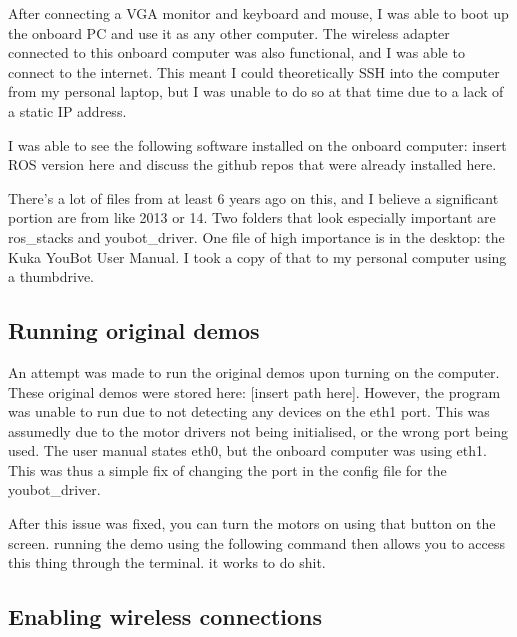 \documentclass[a4paper, 12pt]{article}
\newif\ifshownotes
\newcommand{\notes}[1]{\ifshownotes\textcolor{blue}{#1}\fi}
\begin{document}
    After connecting a VGA monitor and keyboard and mouse, I was able to boot up the onboard PC and use it as any other computer. The wireless adapter connected to this onboard computer was also functional, and I was able to connect to the internet. This meant I could theoretically SSH into the computer from my personal laptop, but I was unable to do so at that time due to a lack of a static IP address.


    
    I was able to see the following software installed on the onboard computer: insert ROS version here and discuss the github repos that were already installed here. 

    There’s a lot of files from at least 6 years ago on this, and I believe a significant portion are from like 2013 or 14. Two folders that look especially important are ros\_stacks and youbot\_driver. One file of high importance is in the desktop: the Kuka YouBot User Manual. I took a copy of that to my personal computer using a thumbdrive.  
    
    \notes{discuss powering up, initial software inspection, static IP issue}
    
    
    \pagebreak

    \subsection{Running original demos}
    \notes{describe fixing network issue, and hten running the original demos.}

    An attempt was made to run the original demos upon turning on the computer. These original demos were stored here: [insert path here].
    However, the program was unable to run due to not detecting any devices on the eth1 port. This was assumedly due to the motor drivers not being initialised, or the wrong port being used. The user manual states eth0, but the onboard computer was using eth1. This was thus a simple fix of changing the port in the config file for the youbot\_driver. 

    
    After this issue was fixed, you can turn the motors on using that button on the screen. running the demo using the following command then allows you to access this thing through the terminal. it works to do shit.


    \subsection{Enabling wireless connections}
\end{document}
